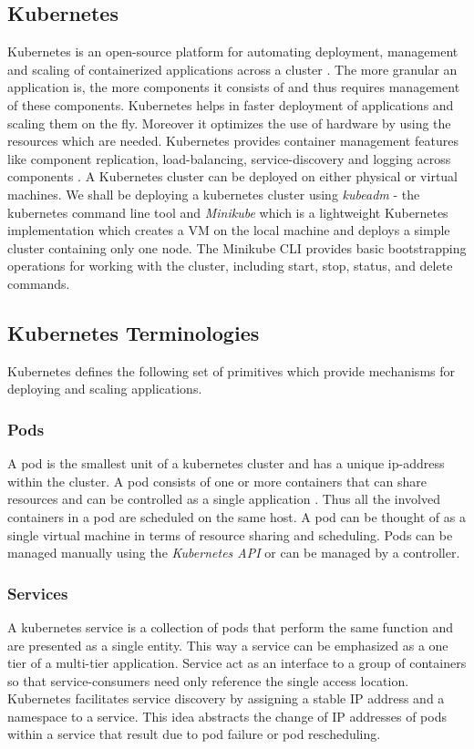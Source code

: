 \documentclass[9pt,twocolumn,twoside]{../../styles/osajnl}
\begin{document}
\subsection{Kubernetes}
Kubernetes is an open-source platform for automating deployment,
management and scaling of containerized applications across a cluster
\cite{www-wiki-kubernetes}. The more granular an application is, the more components it
consists of and thus requires management of these
components. Kubernetes helps in faster deployment of applications and
scaling them on the fly. Moreover it optimizes the use of hardware by
using the resources which are needed. Kubernetes provides container
management features like component replication, load-balancing,
service-discovery and logging across components \cite{www-kubernetes-architecture}. A Kubernetes
cluster can be deployed on either physical or virtual machines. We
shall be deploying a kubernetes cluster using \emph{kubeadm} - the
kubernetes command line tool and \emph{Minikube} which is a
lightweight Kubernetes implementation which creates a VM on the local
machine and deploys a simple cluster containing only one node. The
Minikube CLI provides basic bootstrapping operations for working with
the cluster, including start, stop, status, and delete commands.

\subsection{Kubernetes Terminologies}
Kubernetes defines the following set of primitives which provide
mechanisms for deploying and scaling applications.

\subsubsection{Pods}
A pod is the smallest unit of a kubernetes cluster and has a unique
ip-address within the cluster. A pod consists of one or more
containers that can share resources and can be controlled as a single
application \cite{www-wiki-kubernetes} \cite{www-kubernetes-digitalocean}. Thus all the involved containers in a
pod are scheduled on the same host. A pod can be thought of as a
single virtual machine in terms of resource sharing and scheduling.
Pods can be managed manually using the \emph{Kubernetes API} or can be
managed by a controller.

\subsubsection{Services}
A kubernetes service is a collection of pods that perform the same
function and are presented as a single entity. This way a service can
be emphasized as a one tier of a multi-tier application. Service act
as an interface to a group of containers so that service-consumers
need only reference the single access location. Kubernetes facilitates
service discovery by assigning a stable IP address and a namespace to
a service. This idea abstracts the change of IP addresses of pods
within a service that result due to pod failure or pod rescheduling.
\end{document}

